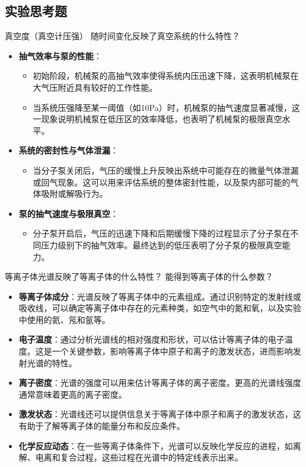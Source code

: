 \documentclass[dvipsnames, svgnames,a4paper,11pt]{article}
\begin{document}
	\subsection{实验思考题}
	
	\begin{question}
		真空度（真空计压强） 随时间变化反映了真空系统的什么特性？
	\end{question}
	\begin{itemize}
		\item \textbf{抽气效率与泵的性能}：
		\begin{itemize}
			\item 初始阶段，机械泵的高抽气效率使得系统内压迅速下降，这表明机械泵在大气压附近具有较好的工作性能。
			\item 当系统压强降至某一阈值（如10Pa）时，机械泵的抽气速度显著减慢，这一现象说明机械泵在低压区的效率降低，也表明了机械泵的极限真空水平。
		\end{itemize}
		
		\item \textbf{系统的密封性与气体泄漏}：
		\begin{itemize}
			\item 当分子泵关闭后，气压的缓慢上升反映出系统中可能存在的微量气体泄漏或回气现象。这可以用来评估系统的整体密封性能，以及泵内部可能的气体吸附或解吸行为。
		\end{itemize}
		
		\item \textbf{泵的抽气速度与极限真空}：
		\begin{itemize}
			\item 分子泵开启后，气压的迅速下降和后期缓慢下降的过程显示了分子泵在不同压力级别下的抽气效率。最终达到的低压表明了分子泵的极限真空能力。
		\end{itemize}
	\end{itemize}
	
	\begin{question}
		等离子体光谱反映了等离子体的什么特性？ 能得到等离子体的什么参数？
	\end{question}
	\begin{itemize}
		\item \textbf{等离子体成分}：光谱反映了等离子体中的元素组成。通过识别特定的发射线或吸收线，可以确定等离子体中存在的元素种类，如空气中的氮和氧，以及实验中使用的氦、氖和氩等。
		
		\item \textbf{电子温度}：通过分析光谱线的相对强度和形状，可以估计等离子体的电子温度。这是一个关键参数，影响等离子体中原子和离子的激发状态，进而影响发射光谱的特性。
	
		\item \textbf{离子密度}：光谱的强度可以用来估计等离子体的离子密度。更高的光谱线强度通常意味着更高的离子密度。
	
		\item \textbf{激发状态}：光谱线还可以提供信息关于等离子体中原子和离子的激发状态，这有助于了解等离子体的能量分布和反应条件。
	
		\item \textbf{化学反应动态}：在一些等离子体条件下，光谱可以反映化学反应的进程，如离解、电离和复合过程，这些过程在光谱中的特定线表示出来。
	\end{itemize}
	
\end{document}
